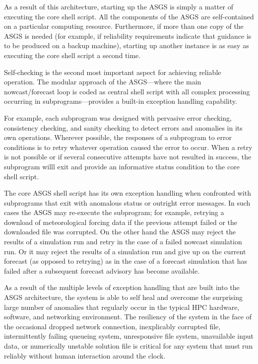 \documentclass[jmse,article,submit,moreauthors,pdftex,12pt,a4paper]{mdpi}
\begin{document}
As a result of this architecture, starting up the ASGS is simply a 
matter of executing the core shell script. All the components of the 
ASGS are self-contained on a particular computing resource. 
Furthermore, if more than one copy of the ASGS is needed (for 
example, if reliability requirements indicate that guidance is to be 
produced on a backup machine), starting up another instance is as 
easy as executing the core shell script a second time.

Self-checking is the second most important aspect for achieving 
reliable operation. The modular approach of the ASGS---where the 
main nowcast/forecast loop is coded as central shell script with all 
complex processing occurring in subprograms---provides a built-in
exception handling capability. 

For example, each subprogram was designed with pervasive error 
checking, consistency checking, and sanity checking to detect errors 
and anomalies in its own operations. Wherever possible, the 
responses of a subprogram to error conditions is to retry whatever 
operation caused the error to occur. When a retry is not possible or 
if several consecutive attempts have not resulted in success, the 
subprogram willl exit and provide an informative status condition to 
the core shell script. 

The core ASGS shell script has its own exception handling when 
confronted with subprograms that exit with anomalous status or 
outright error messages. In such cases the ASGS may re-execute the 
subprogram; for example, retrying a download of meteorological 
forcing data if the previous attempt failed or the downloaded file 
was corrupted. On the other hand the ASGS may reject the results of 
a simulation run and retry in the case of a failed nowcast 
simulation run. Or it may reject the results of a simulation run and 
give up on the current forecast (as opposed to retrying) as in the 
case of a forecast simulation that has failed after a subsequent 
forecast advisory has become available. 

As a result of the multiple levels of exception handling that are 
built into the ASGS architecture, the system is able to self heal 
and overcome the surprising large number of anomalies that regularly 
occur in the typical HPC hardware, software, and networking 
environment. The resiliency of the system in the face of the 
occasional dropped network connection, inexplicably corrupted file, 
intermittently failing queueing system, unresponsive file system, 
unavailable input data, or numerically unstable solution file is 
critical for any system that must run reliably without human 
interaction around the clock. 
\end{document}
